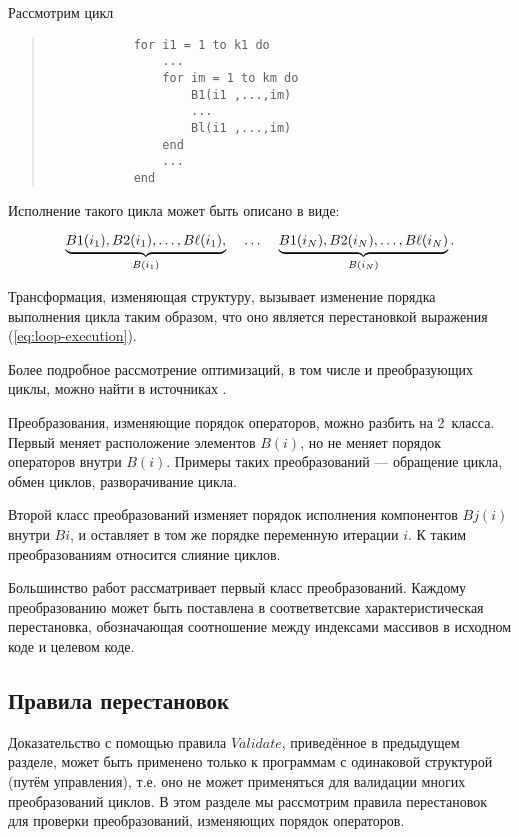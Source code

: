 Рассмотрим цикл

\begin{center}
	\begin{quote}
		\begin{verbatim}
			for i1 = 1 to k1 do
    			...
				for im = 1 to km do
					B1(i1 ,...,im)
					...
					Bl(i1 ,...,im)
				end
				...
			end
		\end{verbatim}
	\end{quote}
\end{center}

Исполнение такого цикла может быть описано в виде:

\begin{equation}\label{eq:loop-execution}
	\underbrace{B1(i_{1}), B2(i_{1}), \ldots, B\ell(i_{1}),}_{B(i_{1})} 
	\hspace{4mm} \ldots \hspace{4mm} 
	\underbrace{B1(i_{N}), B2(i_{N}), \ldots, B\ell(i_{N})}_{B(i_{N})}.
\end{equation}

Трансформация, изменяющая структуру, вызывает изменение порядка выполнения цикла таким образом, что оно является перестановкой выражения (\ref{eq:loop-execution}).

Более подробное рассмотрение оптимизаций, в том числе и преобразующих циклы, можно найти в источниках \cite{ZuckPFGH02,Bacon}.

Преобразования, изменяющие порядок операторов, можно разбить на 2~класса. Первый меняет расположение элементов $B(i)$, но не меняет порядок операторов внутри $B(i)$. Примеры таких преобразований --- обращение цикла, обмен циклов, разворачивание цикла.

Второй класс преобразований изменяет порядок исполнения компонентов $Bj(i)$ внутри $B{i}$, и оставляет в том же порядке переменную итерации $i$. К таким преобразованиям относится слияние циклов.

Большинство работ рассматривает первый класс преобразований. Каждому преобразованию может быть поставлена в соответветсвие характеристическая перестановка, обозначающая соотношение между индексами массивов в исходном коде и целевом коде.

\subsection{Правила перестановок}

Доказательство с помощью правила $Validate$, приведённое в предыдущем разделе, может быть применено только к программам с одинаковой структурой (путём управления), т.е. оно не может применяться для валидации многих преобразований циклов. В этом разделе мы рассмотрим правила перестановок для проверки преобразований, изменяющих порядок операторов.

